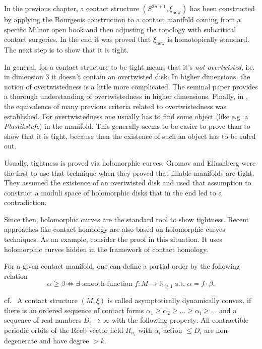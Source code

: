 In the previous chapter, a contact structure $(S^{2n+1}, \xi_\text{new})$ has been constructed by applying the Bourgeois construction
to a contact manifold coming from a specific Milnor open book and then adjusting the topology with subcritical contact surgeries.
In the end it was proved that $\xi_\text{new}$ is homotopically standard.
The next step is to show that it is tight. 

In general, for a contact structure to be tight means that it's \textit{not overtwisted}, i.e. in dimension 3 it doesn't contain an overtwisted disk.
In higher dimensions, the notion of overtwistedness is a little more complicated. 
The seminal paper \cite{BEM15} provides a thorough understanding of overtwistedness in higher dimensions.
Finally, in \cite{CMP19}, the equivalence of many previous criteria related to overtwistedness was established.
For overtwistedness one usually has to find some object (like e.g. a \textit{Plastikstufe}) in the manifold.
This generally seems to be easier to prove than to show that it is tight, because then the existence of such an object has to be ruled out.

Usually, tightness is proved via holomorphic curves. Gromov and Eliashberg were the first to use that technique \cite{Gromov85,Eliashberg91}
when they proved that fillable manifolds are tight. They assumed the existence of an overtwisted disk and used that assumption to construct
a moduli space of holomorphic disks that in the end led to a contradiction.

Since then, holomorphic curves are the standard tool to show tightness.
Recent approaches like contact homology are also based on holomorphic curves techniques.
As an example, consider the proof in this situation. It uses holomorphic curves hidden in the framework of contact homology.

For a given contact manifold, one can define a partial order by the following relation
\[
    \alpha \geq \beta \Leftrightarrow \exists \text{ smooth function } f: M \to \mathbb R_{\geq 1} \text{ s.t. } \alpha = f \cdot \beta.
\]
\begin{definition}[k-ADC]cf.~\cite{Zhou21b,Lazarev20}
    A contact structure $(M, \xi)$ is called asymptotically dynamically convex, if there is an ordered sequence of contact forms 
    $\alpha_1 \geq \alpha_2 \geq \dots \geq \alpha_i \geq \dots$ and a sequence of real numbers $D_i \to \infty$
    with the following property:
    All contractible periodic orbits of the Reeb vector field $R_{\alpha_i}$ with $\alpha_i$-action $\leq D_i$ are non-degenerate
    and have degree $> k$.
\end{definition}

